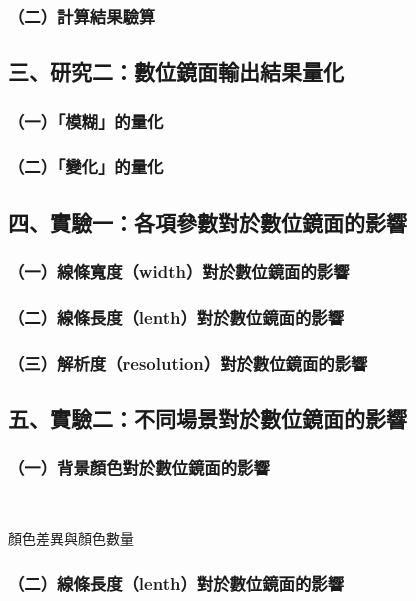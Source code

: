 \documentclass[12pt]{article}
\begin{document}
\subsubsection{（二）計算結果驗算}

\subsection{三、研究二：數位鏡面輸出結果量化}

\subsubsection{（一）「模糊」的量化}

\subsubsection{（二）「變化」的量化}

\subsection{四、實驗一：各項參數對於數位鏡面的影響}

\subsubsection{（一）線條寬度（width）對於數位鏡面的影響}

\subsubsection{（二）線條長度（lenth）對於數位鏡面的影響}

\subsubsection{（三）解析度（resolution）對於數位鏡面的影響}

\subsection{五、實驗二：不同場景對於數位鏡面的影響}

\subsubsection{（一）背景顏色對於數位鏡面的影響}
\

顏色差異與顏色數量

\subsubsection{（二）線條長度（lenth）對於數位鏡面的影響}
\end{document}
